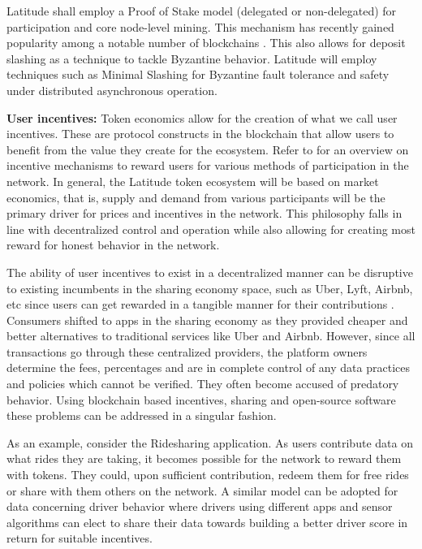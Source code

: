 Latitude shall employ a Proof of Stake model (delegated or non-delegated) for participation and core node-level mining. This mechanism has recently
gained popularity among a notable number of blockchains \cite{dpos_steemit}. This also allows for deposit slashing as a
technique to tackle Byzantine behavior. Latitude will employ techniques such as Minimal Slashing \cite{buterin_slashing}
for Byzantine fault tolerance and safety under distributed asynchronous operation.

\noindent
{\bf User incentives:}
Token economics allow for the creation of what we call user incentives. These are protocol constructs in the blockchain
that allow users to benefit from the value they create for the ecosystem. Refer to \cite{token_ecos} for an overview on
incentive mechanisms to reward users for various methods of participation in the network. In general, the Latitude token
ecosystem will be based on market economics, that is, supply and demand from various participants will be the primary
driver for prices and incentives in the network. This philosophy falls in line with decentralized control and operation
while also allowing for creating most reward for honest behavior in the network.

The ability of user incentives to exist in a decentralized manner can be disruptive to existing incumbents in the
sharing economy space, such as Uber, Lyft, Airbnb, etc since users can get rewarded in a tangible manner for their
contributions \cite{sharing_eco_bc}. Consumers shifted to apps in the sharing economy as they provided cheaper and
better alternatives to traditional services like Uber and Airbnb. However, since all transactions go through these
centralized providers, the platform owners determine the fees, percentages and are in complete control of any data
practices and policies which cannot be verified. They often become accused of predatory behavior. Using blockchain based
incentives, sharing and open-source software these problems can be addressed in a singular fashion.

As an example, consider the Ridesharing application. As users contribute data on what rides they are taking, it becomes
possible for the network to reward them with tokens. They could, upon sufficient contribution, redeem them for free
rides or share with them others on the network. A similar model can be adopted for data concerning driver behavior where
drivers using different apps and sensor algorithms can elect to share their data towards building a better driver score
in return for suitable incentives.

